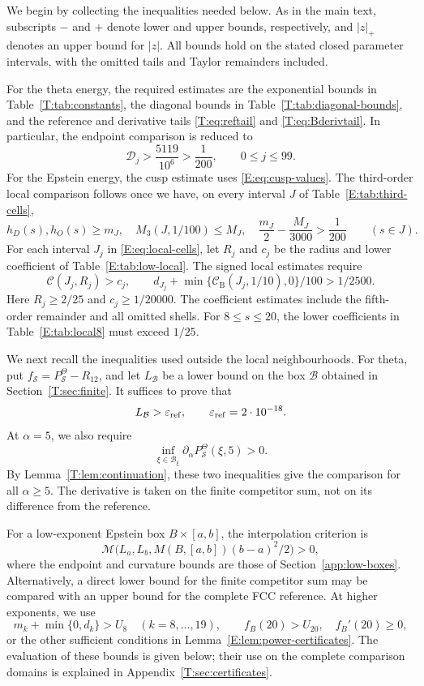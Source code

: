 \documentclass[reqno,english]{amsart}
\theoremstyle{definition}
\newtheorem{open problem}[theorem]{Open Problem}
\theoremstyle{remark}
\theoremstyle{plain}
\numberwithin{equation}{section}
\begin{document}
We begin by collecting the inequalities needed below. As in the main
text, subscripts $-$ and $+$ denote lower and upper bounds, respectively,
and $|z|_+$ denotes an upper bound for $|z|$. All bounds hold on the
stated closed parameter intervals, with the omitted tails and Taylor
remainders included.

For the theta energy, the required estimates are the exponential bounds
in Table~\ref{T:tab:constants}, the diagonal bounds in
Table~\ref{T:tab:diagonal-bounds}, and the reference and derivative tails
\eqref{T:eq:reftail} and \eqref{T:eq:Bderivtail}. In particular, the
endpoint comparison is reduced to
\[
 \mathscr D_j>\frac{5119}{10^6}>\frac1{200},\qquad 0\le j\le99.
\]
For the Epstein energy, the cusp estimate uses
\eqref{E:eq:cusp-values}. The third-order local comparison follows once
we have, on every interval $J$ of Table~\ref{E:tab:third-cells},
\[
 h_D(s),h_O(s)\ge m_J,\quad M_3(J,1/100)\le M_J,\quad
 \frac{m_J}{2}-\frac{M_J}{3000}>\frac1{200}\qquad(s\in J).
\]
For each interval $J_j$ in \eqref{E:eq:local-cells}, let $R_j$ and
$c_j$ be the radius and lower coefficient of
Table~\ref{E:tab:low-local}. The signed local estimates require
\[
 \mathcal C(J_j,R_j)>c_j,\qquad
 d_{J_j}+\min\{\mathcal C_{\mathrm B}(J_j,1/10),0\}/100>1/2500.
\]
Here $R_j\ge2/25$ and $c_j\ge1/20000$. The coefficient estimates
include the fifth-order remainder and all omitted shells. For
$8\le s\le20$, the lower coefficients in
Table~\ref{E:tab:local8} must exceed $1/25$.

We next recall the inequalities used outside the local neighbourhoods.
For theta, put $f_{\mathcal S}=P^\Theta_{\mathcal S}-R_{12}$, and
let $L_{\mathcal B}$ be a lower bound on the box $\mathcal B$ obtained
in Section~\ref{T:sec:finite}. It suffices to prove that
\[
 L_{\mathcal B}>\varepsilon_{\rm ref},\qquad
 \varepsilon_{\rm ref}=2\cdot10^{-18}.
\]
At $\alpha=5$, we also require
\[
 \inf_{\xi\in\mathcal B_\xi}
 \partial_\alpha P^\Theta_{\mathcal S}(\xi,5)>0.
\]
By Lemma~\ref{T:lem:continuation}, these two inequalities give the
comparison for all $\alpha\ge5$. The derivative is taken on the
finite competitor sum, not on its difference from the reference.

For a low-exponent Epstein box $B\times[a,b]$, the interpolation
criterion is
\[
 \mathscr M\bigl(L_a,L_b,M(B,[a,b])(b-a)^2/2\bigr)>0,
\]
where the endpoint and curvature bounds are those of
Section~\ref{app:low-boxes}. Alternatively, a direct lower bound for
the finite competitor sum may be compared with an upper bound for the
complete FCC reference. At higher exponents, we use
\[
 m_k+\min\{0,d_k\}>U_8\quad(k=8,\ldots,19),
 \qquad f_B(20)>U_{20},\quad f_B'(20)\ge0,
\]
or the other sufficient conditions in
Lemma~\ref{E:lem:power-certificates}. The evaluation of these bounds
is given below; their use on the complete comparison domains is
explained in Appendix~\ref{T:sec:certificates}.
\end{document}
